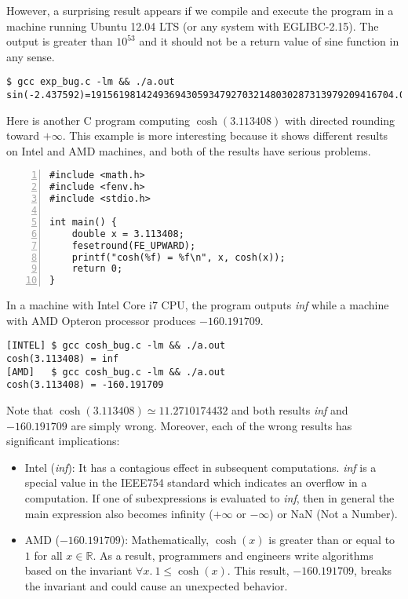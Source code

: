 \documentclass{llncs}
\begin{document}
However, a surprising result appears if we compile and execute the
program in a machine running Ubuntu 12.04 LTS (or any system with
EGLIBC-2.15). The output is greater than $10^{53}$ and it should not be
a return value of sine function in any sense.

\begin{Verbatim}[frame=single, fontsize=\relsize{-1}]
$ gcc exp_bug.c -lm && ./a.out
sin(-2.437592)=191561981424936943059347927032148030287313979209416704.00
\end{Verbatim}

Here is another C program computing $\cosh(3.113408)$ with directed
rounding toward $+\infty$. This example is more interesting because it
shows different results on Intel and AMD machines, and both of the
results have serious problems.

\begin{Verbatim}[numbers=left, frame=single, fontsize=\relsize{-1}]
#include <math.h>
#include <fenv.h>
#include <stdio.h>

int main() {
    double x = 3.113408;
    fesetround(FE_UPWARD);
    printf("cosh(%f) = %f\n", x, cosh(x));
    return 0;
}
\end{Verbatim}

In a machine with Intel Core i7 CPU, the program outputs
\textit{inf} while a machine with AMD Opteron processor produces
$-160.191709$.

\begin{Verbatim}[frame=single, fontsize=\relsize{-1}]
[INTEL] $ gcc cosh_bug.c -lm && ./a.out
cosh(3.113408) = inf
[AMD]   $ gcc cosh_bug.c -lm && ./a.out
cosh(3.113408) = -160.191709
\end{Verbatim}

Note that $\cosh(3.113408) \simeq 11.2710174432$ and both results
\textit{inf} and $-160.191709$ are simply wrong. Moreover, each of the
wrong results has significant implications:

\begin{itemize}
\item Intel (\textit{inf}): It has a contagious effect in subsequent
  computations. \textit{inf} is a special value in the IEEE754
  standard which indicates an overflow in a computation. If one of
  subexpressions is evaluated to \textit{inf}, then in general the
  main expression also becomes infinity ($+\infty$ or $-\infty$) or
  NaN (Not a Number).
\item AMD ($-160.191709$): Mathematically, $\cosh(x)$ is greater than or
  equal to $1$ for all $x \in \mathbb{R}$. As a result, programmers
  and engineers write algorithms based on the invariant $\forall x. \
  1 \le \cosh(x)$. This result, $-160.191709$, breaks the invariant
  and could cause an unexpected behavior.
\end{itemize}
\end{document}
